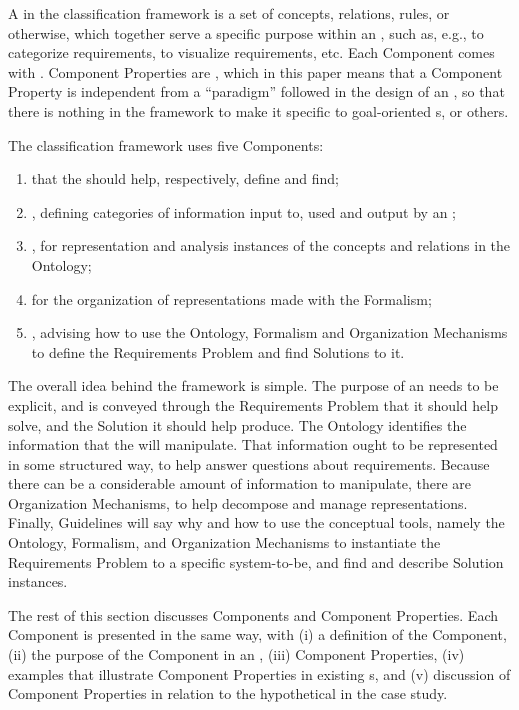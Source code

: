 \documentclass[10pt, final, conference, compsocconf]{IEEEtran}
\begin{document}
A  in the classification framework is a set of concepts, relations, rules, or otherwise, which together serve a specific purpose within an , such as, e.g., to categorize requirements, to visualize requirements, etc. Each Component comes with . Component Properties are , which in this paper means that a Component Property is independent from a ``paradigm'' followed in the design of an , so that there is nothing in the framework to make it specific to goal-oriented s, or others.

The classification framework uses five Components:

\begin{enumerate}
	\item{ that the  should help, respectively, define and find;}
	\item{, defining categories of information input to, used and output by an ;}
	\item{, for representation and analysis instances of the concepts and relations in the Ontology;}
	\item{ for the organization of representations made with the Formalism;}
	\item{, advising how to use the Ontology, Formalism and Organization Mechanisms to define the Requirements Problem and find Solutions to it.}
\end{enumerate}

The overall idea behind the framework is simple. The purpose of an  needs to be explicit, and is conveyed through the Requirements Problem that it should help solve, and the Solution it should help produce. The Ontology identifies the information that the  will manipulate. That information ought to be represented in some structured way, to help answer questions about requirements. Because there can be a considerable amount of information to manipulate, there are Organization Mechanisms, to help decompose and manage representations. Finally, Guidelines will say why and how to use the conceptual tools, namely the Ontology, Formalism, and Organization Mechanisms to instantiate the Requirements Problem to a specific system-to-be, and find and describe Solution instances.

The rest of this section discusses Components and Component Properties. Each Component is presented in the same way, with (i) a definition of the Component, (ii) the purpose of the Component in an , (iii) Component Properties, (iv) examples that illustrate Component Properties in existing s, and (v) discussion of Component Properties in relation to the hypothetical  in the case study.
\end{document}
